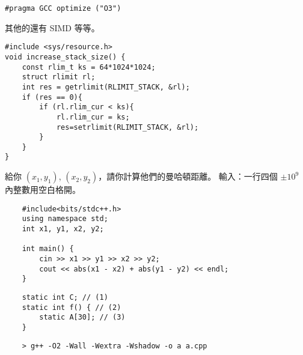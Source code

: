 \documentclass[standalone]{beamer}
\begin{document}


\begin{frame}[fragile]{}
  \begin{verbatim}
#pragma GCC optimize ("O3") 
  \end{verbatim}
  \pause

  其他的還有 SIMD 等等。
\end{frame}

\begin{frame}[fragile]{}
  \begin{verbatim}
#include <sys/resource.h>
void increase_stack_size() {
    const rlim_t ks = 64*1024*1024;
    struct rlimit rl;
    int res = getrlimit(RLIMIT_STACK, &rl);
    if (res == 0){
        if (rl.rlim_cur < ks){
            rl.rlim_cur = ks;
            res=setrlimit(RLIMIT_STACK, &rl);
        }
    }
}
  \end{verbatim}
\end{frame}

\begin{frame}[fragile]{}
  \begin{problem}
    給你 $(x_1, y_1)$, $(x_2, y_2)$，請你計算他們的曼哈頓距離。
    輸入：一行四個 $\pm 10^9$ 內整數用空白格開。
  \end{problem} \pause \disskip
  \begin{verbatim}
    #include<bits/stdc++.h>
    using namespace std;
    int x1, y1, x2, y2;

    int main() {
        cin >> x1 >> y1 >> x2 >> y2;
        cout << abs(x1 - x2) + abs(y1 - y2) << endl;
    }
  \end{verbatim} 
\end{frame}

\begin{frame}[fragile]{}
  \begin{verbatim}
    static int C; // (1)
    static int f() { // (2)
        static A[30]; // (3)
    }
  \end{verbatim} 
  \begin{verbatim}
    > g++ -O2 -Wall -Wextra -Wshadow -o a a.cpp
  \end{verbatim} 
\end{frame}
\end{document}
